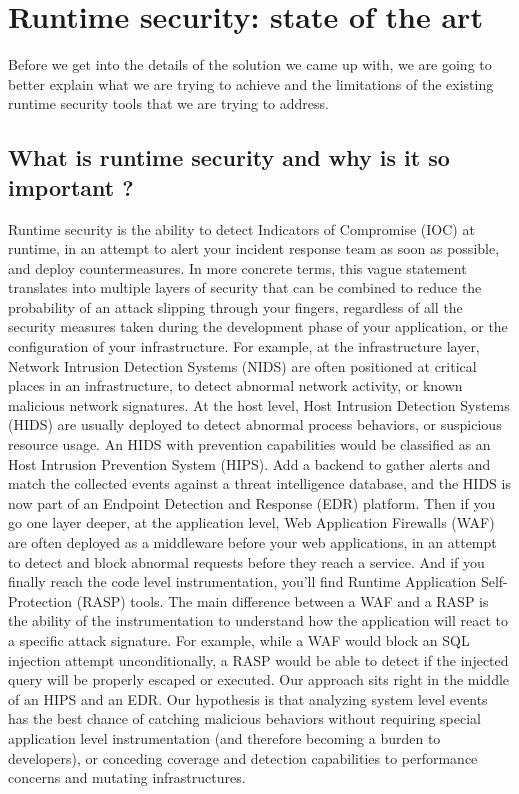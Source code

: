 \section{Runtime security: state of the art}

Before we get into the details of the solution we came up with, we are going to better explain what we are trying to achieve and the limitations of the existing runtime security tools that we are trying to address.

\subsection{What is runtime security and why is it so important ?}

Runtime security is the ability to detect Indicators of Compromise (IOC) at runtime, in an attempt to alert your incident response team as soon as possible, and deploy countermeasures.
In more concrete terms, this vague statement translates into multiple layers of security that can be combined to reduce the probability of an attack slipping through your fingers, regardless of all the security measures taken during the development phase of your application, or the configuration of your infrastructure.
For example, at the infrastructure layer, Network Intrusion Detection Systems (NIDS) are often positioned at critical places in an infrastructure, to detect abnormal network activity, or known malicious network signatures.
At the host level, Host Intrusion Detection Systems (HIDS) are usually deployed to detect abnormal process behaviors, or suspicious resource usage.
An HIDS with prevention capabilities would be classified as an Host Intrusion Prevention System (HIPS).
Add a backend to gather alerts and match the collected events against a threat intelligence database, and the HIDS is now part of an Endpoint Detection and Response (EDR) platform.
Then if you go one layer deeper, at the application level, Web Application Firewalls (WAF) are often deployed as a middleware before your web applications, in an attempt to detect and block abnormal requests before they reach a service.
And if you finally reach the code level instrumentation, you’ll find Runtime Application Self-Protection (RASP) tools.
The main difference between a WAF and a RASP is the ability of the instrumentation to understand how the application will react to a specific attack signature.
For example, while a WAF would block an SQL injection attempt unconditionally, a RASP would be able to detect if the injected query will be properly escaped or executed.
Our approach sits right in the middle of an HIPS and an EDR.
Our hypothesis is that analyzing system level events has the best chance of catching malicious behaviors without requiring special application level instrumentation (and therefore becoming a burden to developers), or conceding coverage and detection capabilities to performance concerns and mutating infrastructures.

